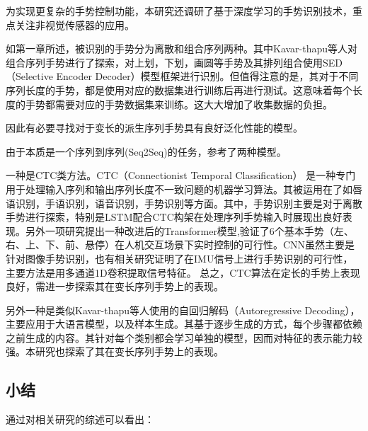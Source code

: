 为实现更复杂的手势控制功能，本研究还调研了基于深度学习的手势识别技术，重点关注非视觉传感器的应用。

如第一章所述，被识别的手势分为离散和组合序列两种。其中Kavar-thapu等人\cite{kavarthapu2017hand}对组合序列手势进行了探索，对上划，下划，画圆等手势及其排列组合使用SED（Selective Encoder Decoder）模型框架进行识别。但值得注意的是，其对于不同序列长度的手势，都是使用对应的数据集进行训练后再进行测试。这意味着每个长度的手势都需要对应的手势数据集来训练。这大大增加了收集数据的负担。

因此有必要寻找对于变长的派生序列手势具有良好泛化性能的模型。

由于本质是一个序列到序列(Seq2Seq)的任务，参考了两种模型。

一种是CTC类方法。CTC（Connectionist Temporal Classification）\cite{graves2006connectionist} 是一种专门用于处理输入序列和输出序列长度不一致问题的机器学习算法。其被运用在了如唇语识别\cite{xu2018lcanet}，手语识别\cite{li2020key}，语音识别\cite{lee2021intermediate}，手势识别\cite{wang2024continuous,karnerrealtime, dahiya2024efficient,sakuma2022mlp}等方面。其中，手势识别主要是对于离散手势进行探索，特别是LSTM配合CTC构架在处理序列手势输入时展现出良好表现。另外一项研究提出一种改进后的Transformer模型\cite{wang2024continuous},验证了6个基本手势（左、右、上、下、前、悬停）在人机交互场景下实时控制的可行性。CNN虽然主要是针对图像手势识别，也有相关研究证明了在IMU信号上进行手势识别的可行性\cite{karnerrealtime, dahiya2024efficient,sakuma2022mlp}，主要方法是用多通道1D卷积提取信号特征。
总之，CTC算法在定长的手势上表现良好，需进一步探索其在变长序列手势上的表现。

另外一种是类似Kavar-thapu等人\cite{kavarthapu2017hand}使用的自回归解码（Autoregressive Decoding），主要应用于大语言模型\cite{you2024linear}，以及样本生成\cite{kaneko2022transgesture}。其基于逐步生成的方式，每个步骤都依赖之前生成的内容。其针对每个类别都会学习单独的模型，因而对特征的表示能力较强。本研究也探索了其在变长序列手势上的表现。

\subsection{小结}

通过对相关研究的综述可以看出：

